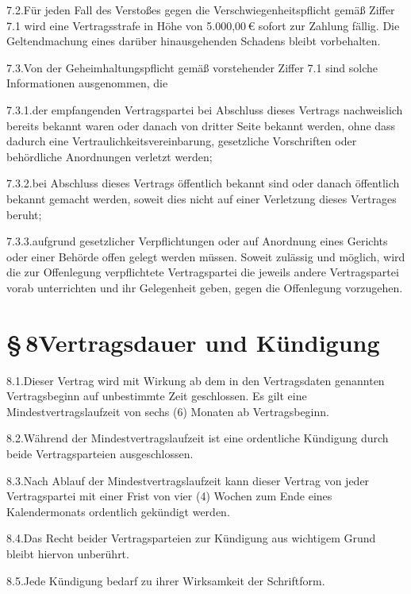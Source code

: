 \documentclass[11pt,a4paper]{article}
\newcommand{\Mindestlaufzeit}{6}
\newcommand{\Vertragsstrafe}{5.000,00}
\begin{document}
7.2.\quad Für jeden Fall des Verstoßes gegen die Verschwiegenheitspflicht gemäß Ziffer 7.1 wird eine Vertragsstrafe in Höhe von \Vertragsstrafe\,€ sofort zur Zahlung fällig. Die Geltendmachung eines darüber hinausgehenden Schadens bleibt vorbehalten.

7.3.\quad Von der Geheimhaltungspflicht gemäß vorstehender Ziffer 7.1 sind solche Informationen ausgenommen, die

7.3.1.\quad der empfangenden Vertragspartei bei Abschluss dieses Vertrags nachweislich bereits bekannt waren oder danach von dritter Seite bekannt werden, ohne dass dadurch eine Vertraulichkeitsvereinbarung, gesetzliche Vorschriften oder behördliche Anordnungen verletzt werden;

7.3.2.\quad bei Abschluss dieses Vertrags öffentlich bekannt sind oder danach öffentlich bekannt gemacht werden, soweit dies nicht auf einer Verletzung dieses Vertrages beruht;

7.3.3.\quad aufgrund gesetzlicher Verpflichtungen oder auf Anordnung eines Gerichts oder einer Behörde offen gelegt werden müssen. Soweit zulässig und möglich, wird die zur Offenlegung verpflichtete Vertragspartei die jeweils andere Vertragspartei vorab unterrichten und ihr Gelegenheit geben, gegen die Offenlegung vorzugehen.

\section{§\,8\quad Vertragsdauer und Kündigung}

8.1.\quad Dieser Vertrag wird mit Wirkung ab dem in den Vertragsdaten genannten Vertragsbeginn auf unbestimmte Zeit geschlossen. Es gilt eine Mindestvertragslaufzeit von sechs (\Mindestlaufzeit) Monaten ab Vertragsbeginn.

8.2.\quad Während der Mindestvertragslaufzeit ist eine ordentliche Kündigung durch beide Vertragsparteien ausgeschlossen.

8.3.\quad Nach Ablauf der Mindestvertragslaufzeit kann dieser Vertrag von jeder Vertragspartei mit einer Frist von vier (4) Wochen zum Ende eines Kalendermonats ordentlich gekündigt werden.

8.4.\quad Das Recht beider Vertragsparteien zur Kündigung aus wichtigem Grund bleibt hiervon unberührt.

8.5.\quad Jede Kündigung bedarf zu ihrer Wirksamkeit der Schriftform.

\end{document}
